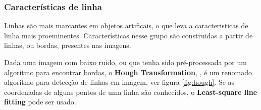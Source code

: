 \subsubsection{Características de linha}

  Linhas são mais marcantes em objetos artificais, o que leva a caracteristicas
de linha mais proeminentes. Características nesse grupo são construidas a partir
de linhas, ou bordas, presentes nas imagens.

  Dada uma imagem com baixo ruido, ou que tenha sido pré-processada por um algoritmo
para encontrar bordas, o \textbf{Hough Transformation}, \cite{Duda:1972:UHT:361237.361242},
é um renomado algoritmo para detecção de linhas em imagem, ver figura \ref{fig:hough}.
Se as coordenadas de alguns pontos de uma linha são conhecidos, o
\textbf{Least-square line fitting} pode ser usado.

